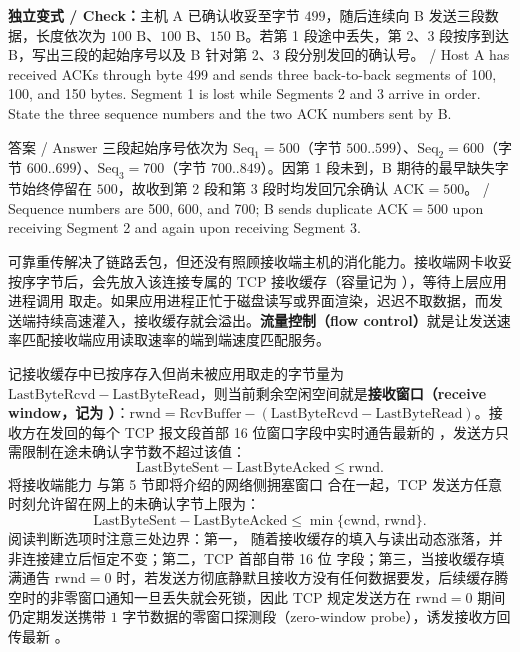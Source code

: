 \textbf{独立变式 / Check：}主机 A 已确认收妥至字节 $499$，随后连续向 B 发送三段数据，长度依次为 $100\text{ B}$、$100\text{ B}$、$150\text{ B}$。若第 1 段途中丢失，第 2、3 段按序到达 B，写出三段的起始序号以及 B 针对第 2、3 段分别发回的确认号。 / Host A has received ACKs through byte 499 and sends three back-to-back segments of 100, 100, and 150 bytes. Segment 1 is lost while Segments 2 and 3 arrive in order. State the three sequence numbers and the two ACK numbers sent by B.

\begin{StudySolution}{答案 / Answer}
三段起始序号依次为 $\mathrm{Seq}_1 = 500$（字节 $500..599$）、$\mathrm{Seq}_2 = 600$（字节 $600..699$）、$\mathrm{Seq}_3 = 700$（字节 $700..849$）。因第 1 段未到，B 期待的最早缺失字节始终停留在 $500$，故收到第 2 段和第 3 段时均发回冗余确认 $\mathrm{ACK} = 500$。 / Sequence numbers are 500, 600, and 700; B sends duplicate $\mathrm{ACK}=500$ upon receiving Segment 2 and again upon receiving Segment 3.
\end{StudySolution}



可靠重传解决了链路丢包，但还没有照顾接收端主机的消化能力。接收端网卡收妥按序字节后，会先放入该连接专属的 TCP 接收缓存（容量记为 ），等待上层应用进程调用  取走。如果应用进程正忙于磁盘读写或界面渲染，迟迟不取数据，而发送端持续高速灌入，接收缓存就会溢出。\textbf{流量控制（flow control）}就是让发送速率匹配接收端应用读取速率的端到端速度匹配服务。

记接收缓存中已按序存入但尚未被应用取走的字节量为 $\mathrm{LastByteRcvd} - \mathrm{LastByteRead}$，则当前剩余空闲空间就是\textbf{接收窗口（receive window，记为 ）}：$\mathrm{rwnd} = \mathrm{RcvBuffer} - (\mathrm{LastByteRcvd} - \mathrm{LastByteRead})$。接收方在发回的每个 TCP 报文段首部 16 位窗口字段中实时通告最新的 ，发送方只需限制在途未确认字节数不超过该值：
\[
\mathrm{LastByteSent} - \mathrm{LastByteAcked} \le \mathrm{rwnd}.
\tag{3.4}
\]
将接收端能力  与第 5 节即将介绍的网络侧拥塞窗口  合在一起，TCP 发送方任意时刻允许留在网上的未确认字节上限为：
\[
\mathrm{LastByteSent} - \mathrm{LastByteAcked} \le \min\{\mathrm{cwnd},\, \mathrm{rwnd}\}.
\tag{3.5}
\]
阅读判断选项时注意三处边界：第一， 随着接收缓存的填入与读出动态涨落，并非连接建立后恒定不变；第二，TCP 首部自带 16 位  字段；第三，当接收缓存填满通告 $\mathrm{rwnd}=0$ 时，若发送方彻底静默且接收方没有任何数据要发，后续缓存腾空时的非零窗口通知一旦丢失就会死锁，因此 TCP 规定发送方在 $\mathrm{rwnd}=0$ 期间仍定期发送携带 $1$ 字节数据的零窗口探测段（zero-window probe），诱发接收方回传最新 。


